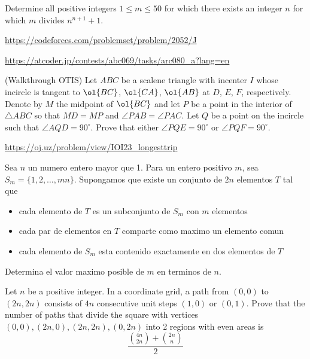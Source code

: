 \documentclass[11pt]{scrartcl}
\begin{document}
\begin{problem}
Determine all positive integers $1 \le m \le 50$ for which there exists an integer $n$ for which $m$ divides $n^{n+1}+1$.
\end{problem}
\begin{problem}[CF 2052J]
\url{https://codeforces.com/problemset/problem/2052/J}
\end{problem}
\begin{problem}[AC ARC80A]
\url{https://atcoder.jp/contests/abc069/tasks/arc080_a?lang=en}
\end{problem}
\begin{problem}
  (Walkthrough OTIS)
  Let $ABC$ be a scalene triangle with incenter $I$ whose incircle is
  tangent to $\ol{BC}$, $\ol{CA}$, $\ol{AB}$ at $D$, $E$, $F$,
  respectively.  Denote by $M$ the midpoint of $\ol{BC}$ and
  let $P$ be a point in the interior of $\triangle ABC$
  so that $MD = MP$ and $\angle PAB = \angle PAC$.
  Let $Q$ be a point on the incircle such that $\angle AQD = 90^{\circ}$.
  Prove that either $\angle PQE = 90^{\circ}$ or $\angle PQF = 90^{\circ}$.
\end{problem}
\begin{problem}
\url{https://oj.uz/problem/view/IOI23_longesttrip}
\end{problem}
\begin{problem}
Sea $n$ un numero entero mayor que 1. Para un entero positivo $m$, sea $S_m=\{ 1,2,\ldots ,mn \}.$ Supongamos que existe un conjunto de $2n$ elementos $T$ tal que 
\begin{itemize}
\item cada elemento de $T$ es un subconjunto de $S_m$ con $m$ elementos
\item cada par de elementos en $T$ comparte como maximo un elemento comun
\item cada elemento de $S_m$ esta contenido exactamente en dos elementos de $T$
\end{itemize}
Determina el valor maximo posible de $m$ en terminos de $n$.
\end{problem}
\begin{problem}[Benelux 2024/2]
Let $n$ be a positive integer. In a coordinate grid, a path from $(0,0)$ to $(2n,2n)$ consists of $4n$ consecutive unit steps $(1,0)$ or $(0,1)$. Prove that the number of paths that divide the square with vertices $(0,0),(2n,0),(2n,2n),(0,2n)$ into 2 regions with even areas is$$\frac{{4n \choose 2n} + {2n \choose n}}{2}$$
\end{problem}
\end{document}
